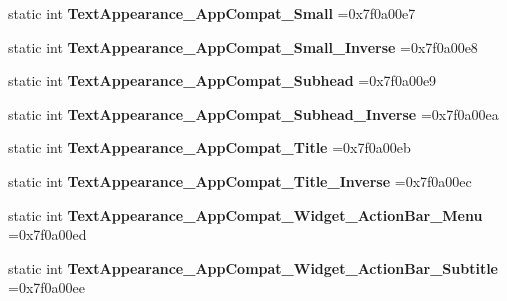 \begin{DoxyCompactItemize}
static int {\bfseries Text\+Appearance\+\_\+\+App\+Compat\+\_\+\+Small} =0x7f0a00e7
\item 
\mbox{\label{classandroid_1_1support_1_1v4_1_1R_1_1style_a1cccb6c2ae4fe11bd488294187ce0faa}} 
static int {\bfseries Text\+Appearance\+\_\+\+App\+Compat\+\_\+\+Small\+\_\+\+Inverse} =0x7f0a00e8
\item 
\mbox{\label{classandroid_1_1support_1_1v4_1_1R_1_1style_a3a83f789e762a06ecd85e123c11c3306}} 
static int {\bfseries Text\+Appearance\+\_\+\+App\+Compat\+\_\+\+Subhead} =0x7f0a00e9
\item 
\mbox{\label{classandroid_1_1support_1_1v4_1_1R_1_1style_a2b66e00dddd7e6b650b05a976b053e26}} 
static int {\bfseries Text\+Appearance\+\_\+\+App\+Compat\+\_\+\+Subhead\+\_\+\+Inverse} =0x7f0a00ea
\item 
\mbox{\label{classandroid_1_1support_1_1v4_1_1R_1_1style_a4a4bdeea4f1ed95769d25f19a8532a1d}} 
static int {\bfseries Text\+Appearance\+\_\+\+App\+Compat\+\_\+\+Title} =0x7f0a00eb
\item 
\mbox{\label{classandroid_1_1support_1_1v4_1_1R_1_1style_a12588fbbed3846161bd4381d96645003}} 
static int {\bfseries Text\+Appearance\+\_\+\+App\+Compat\+\_\+\+Title\+\_\+\+Inverse} =0x7f0a00ec
\item 
\mbox{\label{classandroid_1_1support_1_1v4_1_1R_1_1style_afd060d8985e13a6812a94d83156fc192}} 
static int {\bfseries Text\+Appearance\+\_\+\+App\+Compat\+\_\+\+Widget\+\_\+\+Action\+Bar\+\_\+\+Menu} =0x7f0a00ed
\item 
\mbox{\label{classandroid_1_1support_1_1v4_1_1R_1_1style_a1576b69042cba3744a629447675dd184}} 
static int {\bfseries Text\+Appearance\+\_\+\+App\+Compat\+\_\+\+Widget\+\_\+\+Action\+Bar\+\_\+\+Subtitle} =0x7f0a00ee
\item 
\mbox{\label{classandroid_1_1support_1_1v4_1_1R_1_1style_a1afd5f90fc476150aff6f1c5ce7d79ce}} 

\end{DoxyCompactItemize}
